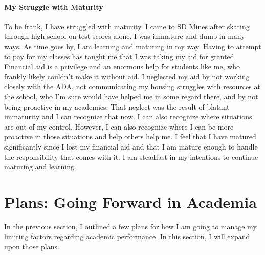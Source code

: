 \documentclass[12pt]{article}
\begin{document}

\paragraph{My Struggle with Maturity}
To be frank, I have struggled with maturity.
I came to SD Mines after skating through high school on test scores alone.
I was immature and dumb in many ways.
As time goes by, I am learning and maturing in my way.
Having to attempt to pay for my classes has taught me that I was taking my 
aid for granted.
Financial aid is a privilege and an enormous help for students like me, who frankly
likely couldn't make it without aid.
I neglected my aid by not working closely with the ADA, %
not communicating my housing struggles with resources at the school, who I'm sure would have 
helped me in some regard there, and by not being proactive in my academics.
That neglect was the result of blatant immaturity and I can recognize that now. 
I can also recognize where situations are out of my control. 
However, I can also recognize where I can be more proactive in those situations 
and help others help me.
I feel that I have matured significantly since I lost my financial aid and that 
I am mature enough to handle the responsibility that comes with it.
I am steadfast in my intentions to continue maturing and learning.


\section*{Plans: Going Forward in Academia}
In the previous section, I outlined a few plans for how I am going to manage my
limiting factors regarding academic performance.
In this section, I will expand upon those plans.
\end{document}
